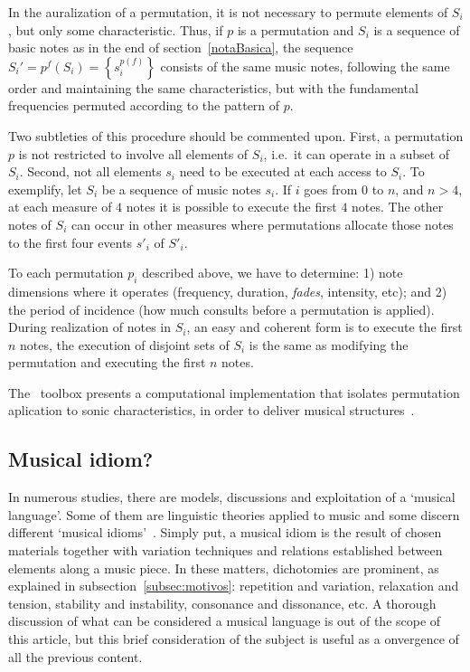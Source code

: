 In the auralization of a permutation, it is not necessary to permute elements of $S_i$,
but only some characteristic. Thus, if $p$ is a permutation and $S_i$ is a sequence of basic notes as in the end of section~\ref{notaBasica}, the
sequence $S_i'=p^f(S_i)=\left\{s_i^{p(f)}\right\}$ consists of the same
music notes, following the same order and maintaining the same characteristics, but with the
fundamental frequencies permuted according to the pattern of $p$.

Two subtleties of this procedure should be commented upon. 
First, a permutation $p$ is not restricted to involve all elements of $S_i$, i.e.\ it can operate in a subset of $S_i$.
Second, not all elements $s_i$ need to be executed at each access to $S_i$. To exemplify, let $S_i$ be a sequence of music notes $s_i$. 
If $i$ goes from $0$ to $n$, and
$n>4$, at each measure of $4$ notes it is possible to execute the first $4$
notes.
The other notes of $S_i$ can occur in other measures where permutations 
allocate those notes to the first four events $s'_i$ of $S'_i$.

To each permutation $p_i$ described above, we have to determine:
1) note dimensions where it operates (frequency, duration, \emph{fades},
intensity, etc); and
2) the period of incidence (how much consults before a permutation is
applied). During realization of notes in $S_i$, an easy and coherent form is to
execute the first $n$ notes, the execution of disjoint sets of $S_i$
is the same as modifying the permutation and executing the first $n$ notes.

The \massa\ toolbox presents a computational implementation that isolates
permutation aplication to sonic characteristics, in order to deliver
musical structures~\cite{MASSA,figgusOriginal,figgusEspacializacao}.

\subsection{Musical idiom?}
In numerous studies, there are models, discussions and exploitation of a `musical language'.
Some of them are linguistic theories applied to music
and some discern different `musical
idioms'~\cite{Lerdahl, Harmonia, Salzer,Alfaix}. Simply put, a musical idiom
is the result of chosen materials together with variation techniques and
relations established between elements along a music piece. In these matters,
dichotomies are prominent, as explained in subsection~\ref{subsec:motivos}:
repetition and variation, relaxation and tension, stability and instability, consonance and dissonance, etc.
A thorough discussion of what can be considered a musical language is out of the scope of this article, but this brief consideration of the subject is useful as a onvergence of all the previous content.

